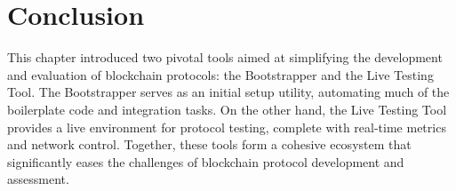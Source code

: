 \section{Conclusion}
This chapter introduced two pivotal tools aimed at simplifying the development and evaluation of blockchain protocols: the Bootstrapper and the Live Testing Tool. The Bootstrapper serves as an initial setup utility, automating much of the boilerplate code and integration tasks. On the other hand, the Live Testing Tool provides a live environment for protocol testing, complete with real-time metrics and network control. Together, these tools form a cohesive ecosystem that significantly eases the challenges of blockchain protocol development and assessment.
